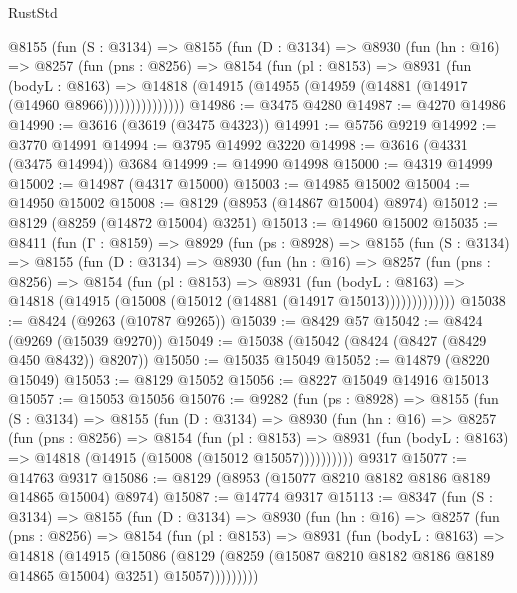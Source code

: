 \begin{lexlean}{RustStd}
\begin{coremodule}
        @8155
          (fun (S : @3134) =>
          @8155
            (fun (D : @3134) =>
            @8930
              (fun (hn : @16) =>
              @8257
                (fun (pns : @8256) =>
                @8154
                  (fun (pl : @8153) =>
                  @8931
                    (fun (bodyL : @8163) =>
                    @14818 (@14915 (@14955 (@14959 (@14881 (@14917 (@14960 @8966)))))))))))))))
@14986 := @3475 @4280
@14987 := @4270 @14986
@14990 := @3616 (@3619 (@3475 @4323))
@14991 := @5756 @9219
@14992 := @3770 @14991
@14994 := @3795 @14992 @3220
@14998 := @3616 (@4331 (@3475 @14994)) @3684
@14999 := @14990 @14998
@15000 := @4319 @14999
@15002 := @14987 (@4317 @15000)
@15003 := @14985 @15002
@15004 := @14950 @15002
@15008 := @8129 (@8953 (@14867 @15004) @8974)
@15012 := @8129 (@8259 (@14872 @15004) @3251)
@15013 := @14960 @15002
@15035 := @8411
    (fun (Γ : @8159) =>
    @8929
      (fun (ps : @8928) =>
      @8155
        (fun (S : @3134) =>
        @8155
          (fun (D : @3134) =>
          @8930
            (fun (hn : @16) =>
            @8257
              (fun (pns : @8256) =>
              @8154
                (fun (pl : @8153) =>
                @8931
                  (fun (bodyL : @8163) =>
                  @14818 (@14915 (@15008 (@15012 (@14881 (@14917 @15013)))))))))))))
@15038 := @8424 (@9263 (@10787 @9265))
@15039 := @8429 @57
@15042 := @8424 (@9269 (@15039 @9270))
@15049 := @15038 (@15042 (@8424 (@8427 (@8429 @450 @8432)) @8207))
@15050 := @15035 @15049
@15052 := @14879 (@8220 @15049)
@15053 := @8129 @15052
@15056 := @8227 @15049 @14916 @15013
@15057 := @15053 @15056
@15076 := @9282
    (fun (ps : @8928) =>
    @8155
      (fun (S : @3134) =>
      @8155
        (fun (D : @3134) =>
        @8930
          (fun (hn : @16) =>
          @8257
            (fun (pns : @8256) =>
            @8154
              (fun (pl : @8153) =>
              @8931 (fun (bodyL : @8163) => @14818 (@14915 (@15008 (@15012 @15057))))))))))
    @9317
@15077 := @14763 @9317
@15086 := @8129 (@8953 (@15077 @8210 @8182 @8186 @8189 @14865 @15004) @8974)
@15087 := @14774 @9317
@15113 := @8347
    (fun (S : @3134) =>
    @8155
      (fun (D : @3134) =>
      @8930
        (fun (hn : @16) =>
        @8257
          (fun (pns : @8256) =>
          @8154
            (fun (pl : @8153) =>
            @8931
              (fun (bodyL : @8163) =>
              @14818
                (@14915
                  (@15086
                    (@8129
                      (@8259 (@15087 @8210 @8182 @8186 @8189 @14865 @15004) @3251)
                      @15057)))))))))

\end{coremodule}
\end{lexlean}
